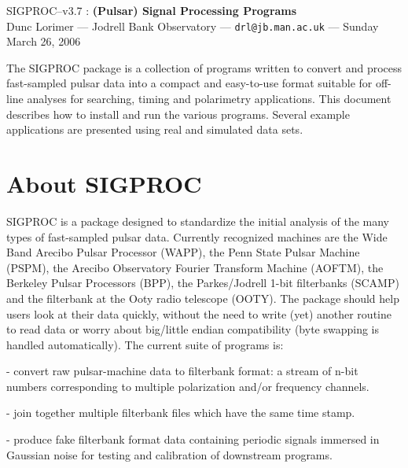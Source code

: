 \documentclass[11pt]{article}
\begin{document}
\begin{center}
{\LARGE {\sc SIGPROC--v3.7} : {\bf (Pulsar) Signal Processing Programs}}\\
\bigskip
\bigskip
{\large Dunc Lorimer --- Jodrell Bank Observatory --- {\tt drl@jb.man.ac.uk} --- Sunday March 26, 2006}
\end{center}
 The SIGPROC package is a collection of
programs written to convert and process fast-sampled pulsar data into
a compact and easy-to-use format suitable for off-line analyses for
searching, timing and polarimetry applications. This document
describes how to install and run the various programs. Several example
applications are presented using real and simulated data sets.
\tableofcontents

\clearpage
\section{About SIGPROC}

SIGPROC is a package designed to standardize the initial analysis of
the many types of fast-sampled pulsar data. Currently recognized
machines are the Wide Band Arecibo Pulsar Processor (WAPP), the Penn
State Pulsar Machine (PSPM), the Arecibo Observatory Fourier Transform
Machine (AOFTM), the Berkeley Pulsar Processors (BPP), the Parkes/Jodrell
1-bit filterbanks (SCAMP) and the
filterbank at the Ooty radio telescope (OOTY). The package
should help users look at their data quickly, without the need to
write (yet) another routine to read data or worry about big/little
  
endian compatibility (byte swapping is handled automatically).  The
current suite of programs is:

\bigskip
{} - convert raw pulsar-machine data to 
filterbank format: a stream of n-bit numbers corresponding to multiple
polarization and/or frequency channels. 

\smallskip
{} - join together multiple filterbank
files which have the same time stamp.

\smallskip
{} - produce fake filterbank format data
containing periodic signals immersed in Gaussian noise for
testing and calibration of downstream programs.
\end{document}
